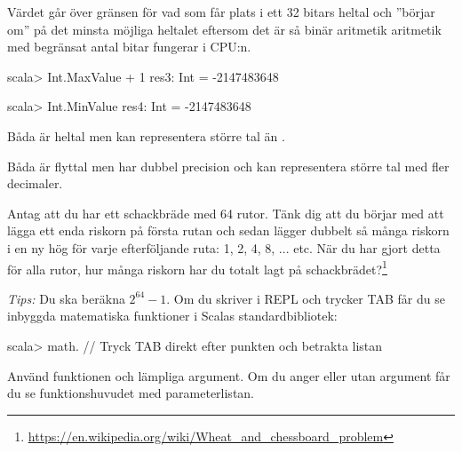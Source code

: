 \TaskSolved \what

\SubtaskSolved

\begin{ConceptConnections}

\end{ConceptConnections}

\SubtaskSolved Värdet går över gränsen för vad som får plats i ett 32 bitars heltal och ''börjar om'' på det minsta möjliga heltalet  eftersom det är så binär aritmetik aritmetik med begränsat antal bitar fungerar i CPU:n.
\begin{REPL}
scala> Int.MaxValue + 1
res3: Int = -2147483648

scala> Int.MinValue
res4: Int = -2147483648
\end{REPL}

\SubtaskSolved Båda är heltal men  kan representera större tal än .

\SubtaskSolved Båda är flyttal men  har dubbel precision och kan representera större tal med fler decimaler.



\QUESTEND






\QUESTBEGIN

\Task \what

\Subtask Antag att du har ett schackbräde med 64 rutor. Tänk dig att du börjar med att lägga ett enda riskorn på första rutan och sedan 
lägger dubbelt så många riskorn i en ny hög för varje efterföljande ruta: 1, 2, 4, 8, ...  etc. När du har gjort detta för alla rutor, 
hur många riskorn har du totalt lagt på schackbrädet?\footnote{\url{https://en.wikipedia.org/wiki/Wheat_and_chessboard_problem}}

\emph{Tips:} Du ska beräkna $2^{64} - 1$. Om du skriver  i REPL och trycker TAB får du se inbyggda matematiska funktioner i Scalas standardbibliotek:
\begin{REPLnonum}
scala> math.    // Tryck TAB direkt efter punkten och betrakta listan
\end{REPLnonum}
Använd funktionen  och lämpliga argument. Om du anger  eller  utan argument får du se funktionshuvudet med 
parameterlistan.

